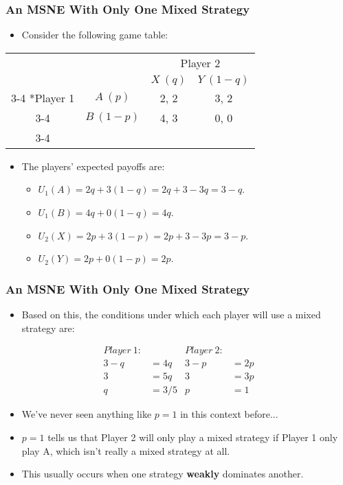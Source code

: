 
\begin{frame}
\frametitle{An MSNE With Only One Mixed Strategy}
\begin{itemize}
	\item Consider the following game table:
\end{itemize}
\begin{table}[h]
	\centering
	\begin{tabular}{cc|c|c|}
		& \multicolumn{1}{c}{} & \multicolumn{2}{c}{Player 2}\\
		& \multicolumn{1}{c}{} & \multicolumn{1}{c}{$X~(q)$}  & \multicolumn{1}{c}{$Y~(1 - q)$} \\\cline{3-4}
		\multirow{2}*{Player 1}  & $A~(p)$ & 2, 2 & 3, 2 \\\cline{3-4}
		& $B~(1 - p)$ & 4, 3 & 0, 0 \\\cline{3-4}
	\end{tabular}
\end{table}
\begin{itemize}
	\item The players' expected payoffs are:
	\begin{itemize}
		\item $U_1(A) = 2q + 3(1 - q) = 2q + 3 - 3q = 3 - q$.
		\item $U_1(B) = 4q + 0(1 - q) = 4q$.
		\item $U_2(X) = 2p + 3(1 - p) = 2p + 3 - 3p = 3 - p$.
		\item $U_2(Y) = 2p + 0(1 - p) = 2p$.
	\end{itemize}
\end{itemize}
\end{frame}


\begin{frame}
\frametitle{An MSNE With Only One Mixed Strategy}
\begin{itemize}
\item Based on this, the conditions under which each player will use a mixed strategy are:
\end{itemize}
\begin{align*}
Player~1: && Player~2:&\\
3 - q &= 4q & 3 - p &= 2p\\
3 &= 5q & 3 &= 3p\\
q &= 3/5 & p &= 1
\end{align*}
\begin{itemize}
\item We've never seen anything like $p = 1$ in this context before...
\item $p = 1$ tells us that Player 2 will only play a mixed strategy
  if Player 1 only play A, which isn't really a mixed strategy at all.
\item This usually occurs when one strategy \textbf{weakly} dominates another.
\end{itemize}
\end{frame}

